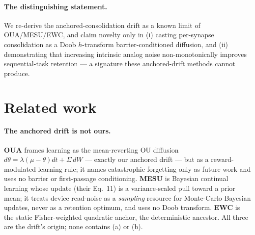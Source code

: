 \documentclass[11pt]{article}
\begin{document}
\paragraph{The distinguishing statement.} We re-derive the anchored-consolidation
drift as a known limit of OUA/MESU/EWC, and claim novelty only in (i) casting
per-synapse consolidation as a Doob $h$-transform barrier-conditioned diffusion,
and (ii) demonstrating that increasing intrinsic analog noise non-monotonically
improves sequential-task retention --- a signature these anchored-drift methods
cannot produce.

\section{Related work}

\paragraph{The anchored drift is not ours.}
\textbf{OUA} \citep{oua2024} frames learning as the mean-reverting OU diffusion
$d\theta=\lambda(\mu-\theta)dt+\Sigma\,dW$ --- exactly our anchored drift --- but as
a reward-modulated learning rule; it names catastrophic forgetting only as future
work and uses no barrier or first-passage conditioning. \textbf{MESU}
\citep{mesu2025} is Bayesian continual learning whose update (their Eq.~11) is a
variance-scaled pull toward a prior mean; it treats device read-noise as a
\emph{sampling} resource for Monte-Carlo Bayesian updates, never as a retention
optimum, and uses no Doob transform. \textbf{EWC} \citep{ewc2017} is the static
Fisher-weighted quadratic anchor, the deterministic ancestor. All three are the
drift's origin; none contains (a) or (b).
\end{document}
